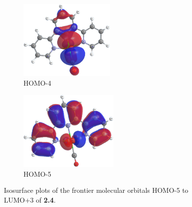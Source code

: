 \begin{figure}[!ht]
\begin{subfigure}[b]{0.31\textwidth}
  \includegraphics[clip=true, width=\textwidth, height=39mm, keepaspectratio]{images/mos/4h-4.eps}
  \caption{HOMO-4}
 \end{subfigure}
 \begin{subfigure}[b]{0.31\textwidth}
  \includegraphics[clip=true, width=\textwidth, height=39mm, keepaspectratio]{images/mos/4h-5.eps}
  \caption{HOMO-5}
 \end{subfigure}
\caption[Molecular orbitals HOMO-5 to LUMO+3 of \textbf{2.4}.]{Isosurface plots of the frontier molecular orbitals HOMO-5 to LUMO+3 of \textbf{2.4}.}
\label{fig.mo24}
\end{figure}


